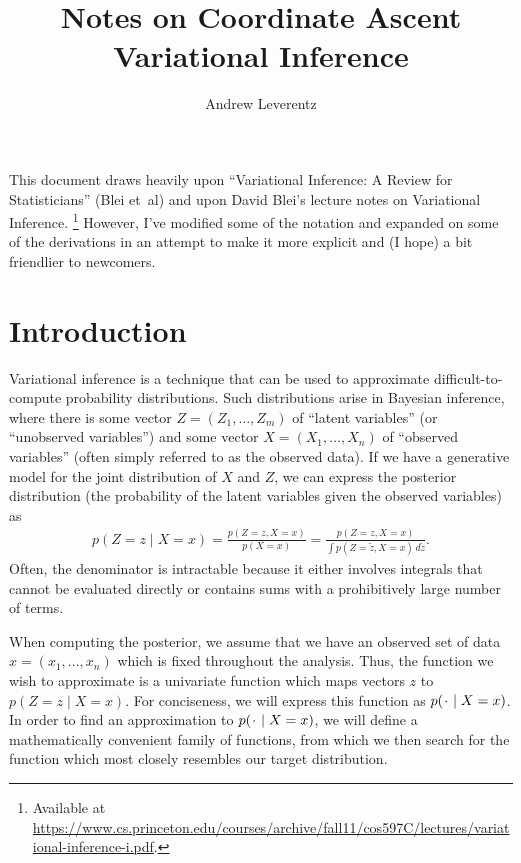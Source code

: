 \documentclass[11pt]{article}
\title{Notes on Coordinate Ascent Variational Inference}
\author{Andrew Leverentz}
\date{}
\newcommand*{\placeholder}{\makebox[1ex]{$\cdot$}}
\begin{document}
\maketitle

\begin{sloppypar}
This document draws heavily upon ``Variational Inference: A Review for Statisticians'' (Blei et~al) and upon David Blei's lecture notes on Variational Inference.%
\footnote{Available at \url{https://www.cs.princeton.edu/courses/archive/fall11/cos597C/lectures/variational-inference-i.pdf}.}
However, I've modified some of the notation and expanded on some of the derivations in an attempt to make it more explicit and (I hope) a bit friendlier to newcomers.
\end{sloppypar}

\section{Introduction}

Variational inference is a technique that can be used to approximate difficult-to-compute probability distributions.
Such distributions arise in Bayesian inference, where there is some vector $Z = (Z_1, \ldots, Z_m)$ of ``latent variables'' (or ``unobserved variables'') and some vector $X = (X_1, \ldots, X_n)$ of ``observed variables'' (often simply referred to as the observed data).
If we have a generative model for the joint distribution of $X$ and $Z$, we can express the posterior distribution (the probability of the latent variables given the observed variables) as
\begin{align}
p(Z = z \mid X = x) = \frac{p(Z=z, X=x)}{p(X=x)} = \frac{p(Z=z, X=x)}{\int p(Z = \tilde{z}, X = x) \, d\tilde{z}}.
\end{align}
Often, the denominator is intractable because it either involves integrals that cannot be evaluated directly or contains sums with a prohibitively large number of terms.

When computing the posterior, we assume that we have an observed set of data $x = (x_1, \ldots, x_n)$ which is fixed throughout the analysis.
Thus, the function we wish to approximate is a univariate function which maps vectors $z$ to $p(Z = z \mid X = x)$.
For conciseness, we will express this function as $p(\placeholder \mid X = x)$.
In order to find an approximation to $p(\placeholder \mid X = x)$, we will define a mathematically convenient family of functions, from which we then search for the function which most closely resembles our target distribution.
\end{document}

